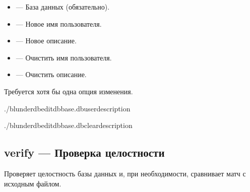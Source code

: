 \documentclass[letterpaper,10pt,russian]{sphinxmanual}
\begin{document}
\sphinxAtStartPar
{}
\begin{itemize}
\item {} 
\sphinxAtStartPar
{} — База данных (обязательно).

\item {} 
\sphinxAtStartPar
{} — Новое имя пользователя.

\item {} 
\sphinxAtStartPar
{} — Новое описание.

\item {} 
\sphinxAtStartPar
{} — Очистить имя пользователя.

\item {} 
\sphinxAtStartPar
{} — Очистить описание.

\end{itemize}

\sphinxAtStartPar
Требуется хотя бы одна опция изменения.

\sphinxAtStartPar
{}

\begin{sphinxVerbatim}[commandchars=\\\{\}]
./blunderdbedit\PYGZhy{}\PYGZhy{}dbbase.db\PYGZhy{}\PYGZhy{}user\PYGZhy{}\PYGZhy{}description

./blunderdbedit\PYGZhy{}\PYGZhy{}dbbase.db\PYGZhy{}\PYGZhy{}clear\PYGZhy{}description
\end{sphinxVerbatim}


\subsection{verify — Проверка целостности}
\label{\detokenize{cli:verify-verifier-l-integrite}}
\sphinxAtStartPar
Проверяет целостность базы данных и, при необходимости, сравнивает матч с исходным файлом.
\end{document}
